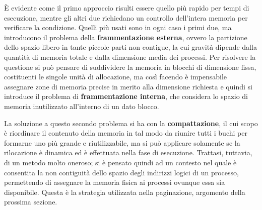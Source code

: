 \noindent È evidente come il primo approccio risulti essere quello più rapido per tempi di esecuzione, mentre gli altri due richiedano un controllo
dell'intera memoria per verificare la condizione. Quelli più usati sono in ogni caso i primi due, ma introducono il problema della \textbf{
frammentazione esterna}, ovvero la partizione dello spazio libero in tante piccole parti non contigue, la cui gravità dipende dalla quantità di memoria
totale e dalla dimensione media dei processi. Per risolvere la questione si può pensare di suddividere la memoria in blocchi di dimensione fissa, 
costituenti le singole unità di allocazione, ma così facendo è impensabile assegnare zone di memoria precise in merito alla dimensione richiesta e
quindi si introduce il problema di \textbf{frammentazione interna}, che considera lo spazio di memoria inutilizzato all'interno di un dato blocco.\par
La soluzione a questo secondo problema si ha con la \textbf{compattazione}, il cui scopo è riordinare il contenuto della memoria in tal modo da riunire
tutti i buchi per formarne uno più grande e riutilizzabile, ma si può applicare solamente se la rilocazione è dinamica ed è effettuata nella fase di
esecuzione. Trattasi, tuttavia, di un metodo molto oneroso; si è pensato quindi ad un contesto nel quale è consentita la non contiguità dello spazio
degli indirizzi logici di un processo, permettendo di assegnare la memoria fisica ai processi ovunque essa sia disponibile. Questa è la strategia
utilizzata nella paginazione, argomento della prossima sezione.

%

